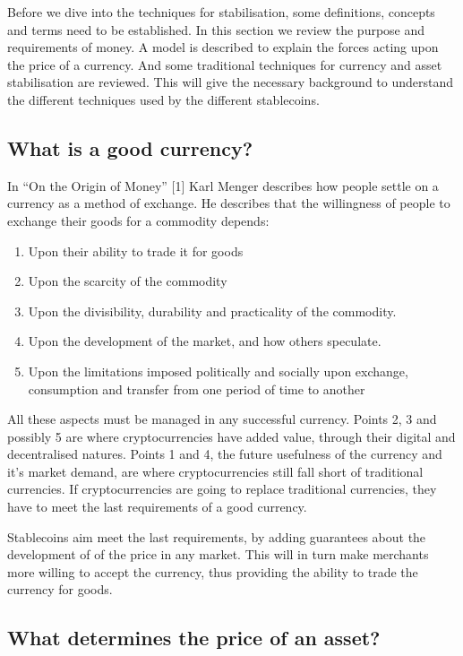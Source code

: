 \documentclass[english,]{IEEEtran}
\providecommand{\tightlist}{%
  \setlength{\itemsep}{0pt}\setlength{\parskip}{0pt}}
\begin{document}
Before we dive into the techniques for stabilisation, some definitions,
concepts and terms need to be established. In this section we review the
purpose and requirements of money. A model is described to explain the
forces acting upon the price of a currency. And some traditional
techniques for currency and asset stabilisation are reviewed. This will
give the necessary background to understand the different techniques
used by the different stablecoins.

\subsection{What is a good currency?}\label{what-is-a-good-currency}

In ``On the Origin of Money'' {[}1{]} Karl Menger describes how people
settle on a currency as a method of exchange. He describes that the
willingness of people to exchange their goods for a commodity depends:

\begin{enumerate}
\def\labelenumi{\arabic{enumi}.}
\tightlist
\item
  Upon their ability to trade it for goods
\item
  Upon the scarcity of the commodity
\item
  Upon the divisibility, durability and practicality of the commodity.
\item
  Upon the development of the market, and how others speculate.
\item
  Upon the limitations imposed politically and socially upon exchange,
  consumption and transfer from one period of time to another
\end{enumerate}

All these aspects must be managed in any successful currency. Points 2,
3 and possibly 5 are where cryptocurrencies have added value, through
their digital and decentralised natures. Points 1 and 4, the future
usefulness of the currency and it's market demand, are where
cryptocurrencies still fall short of traditional currencies. If
cryptocurrencies are going to replace traditional currencies, they have
to meet the last requirements of a good currency.

Stablecoins aim meet the last requirements, by adding guarantees about
the development of of the price in any market. This will in turn make
merchants more willing to accept the currency, thus providing the
ability to trade the currency for goods.

\subsection{What determines the price of an
asset?}\label{what-determines-the-price-of-an-asset}
\end{document}
